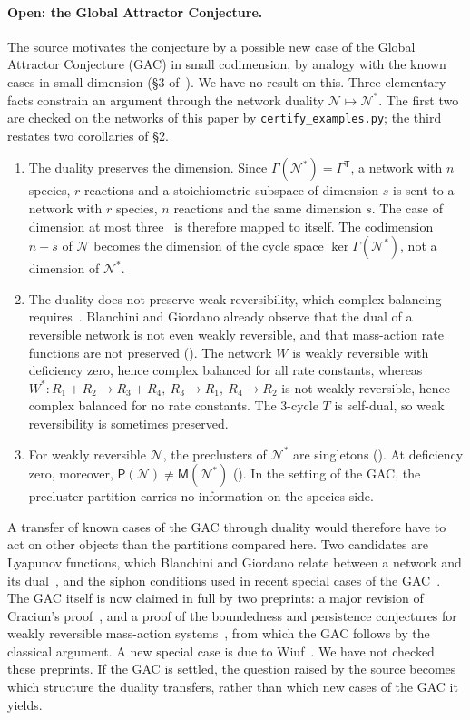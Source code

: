 \documentclass[11pt,a4paper]{report}
\newcommand{\Net}{\mathcal{N}}
\newcommand{\Pre}{\mathsf{P}}
\newcommand{\Mips}{\mathsf{M}}
\begin{document}
\paragraph{Open: the Global Attractor Conjecture.} The source motivates the conjecture by a possible new case of the
Global Attractor Conjecture (GAC) in small codimension, by analogy with the known cases in small dimension (§3
of~\autocite{Iosif2026}). We have no result on this. Three elementary facts constrain an argument through the network
duality \(\Net\mapsto\Net^*\). The first two are checked on the networks of this paper by
\texttt{certify\_examples.py}; the third restates two corollaries of §2.
\begin{enumerate}
\item The duality preserves the dimension. Since \(\Gamma(\Net^*)=\Gamma^{\mathsf T}\), a network with \(n\)
species, \(r\) reactions and a stoichiometric subspace of dimension \(s\) is sent to a network with \(r\) species,
\(n\) reactions and the same dimension \(s\). The case of dimension at most three~\autocite{Pantea2012} is therefore
mapped to itself. The codimension \(n-s\) of \(\Net\) becomes the dimension of the cycle space \(\ker\Gamma(\Net^*)\),
not a dimension of \(\Net^*\).
\item The duality does not preserve weak reversibility, which complex balancing requires~\autocite{HornJackson1972}.
Blanchini and Giordano already observe that the dual of a reversible network is not even weakly reversible, and
that mass-action rate functions are not preserved (\autocite[p.~6]{BlanchiniGiordano2022}). The network \(W\) is weakly reversible with deficiency zero, hence complex balanced for all rate constants, whereas
\(W^*\colon R_1+R_2\to R_3+R_4,\ R_3\to R_1,\ R_4\to R_2\) is not weakly reversible, hence complex balanced for no rate
constants. The 3-cycle \(T\) is self-dual, so weak reversibility is sometimes preserved.
\item For weakly reversible \(\Net\), the preclusters of \(\Net^*\) are singletons (). At deficiency
zero, moreover, \(\Pre(\Net)\ne\Mips(\Net^*)\) (). In the setting of the GAC, the precluster
partition carries no information on the species side.
\end{enumerate}
A transfer of known cases of the GAC through duality would therefore have to act on other objects than the
partitions compared here. Two candidates are Lyapunov functions, which Blanchini and Giordano relate between a
network and its dual~\autocite{BlanchiniGiordano2022}, and the siphon conditions used in recent special cases of the
GAC~\autocite{Wiuf2026}. The GAC itself is now claimed in full by two preprints: a major revision of Craciun's
proof~\autocite{Craciun2015GAC}, and a proof of the boundedness and persistence conjectures for weakly reversible
mass-action systems~\autocite{OpenAI2026persistence}, from which the GAC follows by the classical argument. A new
special case is due to Wiuf~\autocite{Wiuf2026}. We have not checked these preprints. If the GAC is settled, the
question raised by the source becomes which structure the duality transfers, rather than which new cases of the GAC
it yields.
\end{document}
